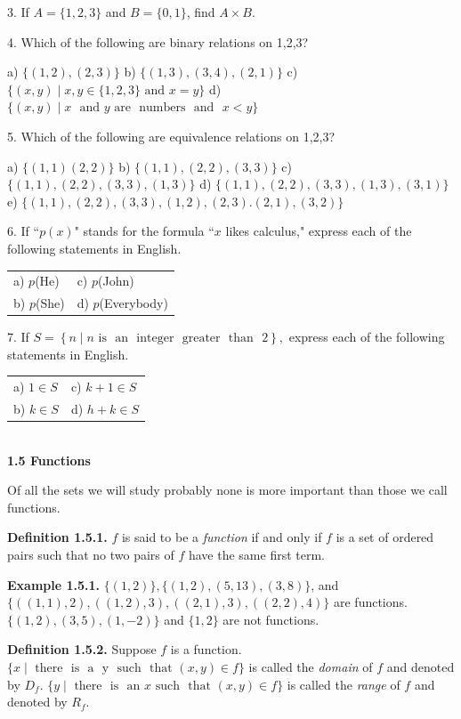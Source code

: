 \begin{large}
3. If $A= \{1,2,3\}$ and $B= \{0,1 \}$, find $A \times B$.  \nl

4. 	Which of the following are binary relations on {1,2,3}? \nl

a) $\{(1,2),(2,3)\}$ \nl
b) $\{(1,3),(3,4),(2,1)\}$  \nl
c) $\{(x,y) \mid x,y \in \{1,2,3\} \text{~and~} x=y\} $ \nl
d) $\{(x,y) \mid  x \text{~ and~} y \text{~are ~numbers~ and ~}x < y\}$ \nl

5. 	Which of the following are equivalence relations on {1,2,3}? \nl

a) $\{(1,1) (2,2)\}$\nl
b) $\{(1,1), (2,2), (3,3)\}$\nl
c) $\{(1,1), (2,2), (3,3), (1,3)\}$\nl
d) $\{(1,1), (2,2), (3,3), (1,3), (3,1)\}$\nl
e) $\{(1,1), (2,2), (3,3), (1,2), (2,3). (2,1), (3,2)\}$\nl

6.  If ``$p(x)$" stands for the formula ``$x$ likes calculus," express each of the following statements in English.\nl

\begin{tabular}{l l}
a) $p$(He) & c) $p$(John)\\
b) $p$(She)& d) $p$(Everybody)\\
\end{tabular}\nl

7. If $S = \left\lbrace n \mid n \text{~is ~an ~integer ~greater ~than ~2} \right\rbrace,$ express each of the following statements in English.\nl

\begin{tabular}{l l}
a) $1 \in S$ & c) $k + 1 \in S$\\
b) $k \in S$ & d) $h + k \in S$\\
\end{tabular}\\
\newpage
\textbf{1.5 Functions}\nl

 Of all the sets we will study probably none is more important than those we call functions.\nl
 
\textbf{Definition 1.5.1.} $f$ is said to be a \textit{function} if and only if $f$ is a set of ordered pairs such that no two pairs of $f$ have the same first term. \nl

\textbf{Example 1.5.1.} $\{(1,2)\}, \{(1,2),(5,13),(3, 8)\}$, and $\{((1,1),2), ((1,2),3), ((2,1),3), ((2,2),4)\}$ are functions. $\{(1,2), (3,5), (1,-2)\}$ and $\{ 1, 2\}$ are not functions. \nl

\textbf{Definition 1.5.2.} Suppose $f$ is a function. $\{x \mid \text{~there ~is ~a ~y~} \text{~such ~that~} (x,y) \in f\}$ is called the \textit{domain} of $f$ and denoted by $D_{f}$.  $\{y \mid \text {~there ~is ~an~} x \text{~such ~that~} (x,y) \in f\}$ is called the \textit{range} of $f$ and denoted by $R_{f}$. \nl


\end{large}
